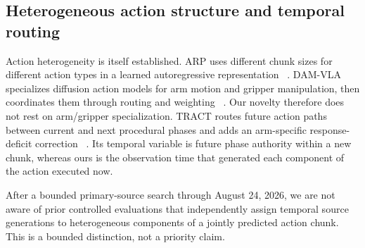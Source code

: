 \subsection{Heterogeneous action structure and temporal routing}

Action heterogeneity is itself established. ARP uses different chunk sizes for
different action types in a learned autoregressive representation
~\cite{zhang2025arp}. DAM-VLA specializes diffusion action models for arm motion
and gripper manipulation, then coordinates them through routing and weighting
~\cite{peng2026damvla}. Our novelty therefore does not rest on arm/gripper
specialization. TRACT routes future action paths between current and next
procedural phases and adds an arm-specific response-deficit correction
~\cite{liu2026tract}. Its temporal variable is future phase authority within a
new chunk, whereas ours is the observation time that generated each component
of the action executed now.

After a bounded primary-source search through August 24, 2026, we are not aware
of prior controlled evaluations that independently assign temporal source
generations to heterogeneous components of a jointly predicted action chunk.
This is a bounded distinction, not a priority claim.
